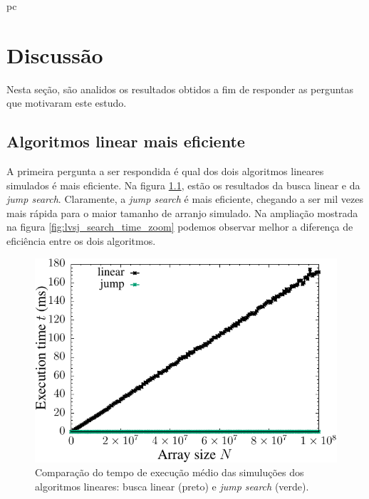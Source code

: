 pc\chapter{Discussão}

Nesta seção, são analidos os resultados obtidos a fim de responder as perguntas que motivaram este estudo.

\section{Algoritmos linear mais eficiente}

A primeira pergunta a ser respondida é qual dos dois algoritmos lineares simulados é mais eficiente. Na figura \ref{fig:lvsj_search_time}, estão os resultados da busca linear e da {\it jump search}. Claramente, a {\it jump search} é mais eficiente, chegando a ser mil vezes mais rápida para o maior tamanho de arranjo simulado. Na ampliação mostrada na figura \ref{fig:lvsj_search_time_zoom} podemos observar melhor a diferença de eficiência entre os dois algoritmos. 

\begin{figure}[H]
  \centering
  \includegraphics[scale=1.2]{../plots/lvsj_search_time.pdf}
  \caption{Comparação do tempo de execução médio das simuluções dos algoritmos lineares: busca linear (preto) e {\it jump search} (verde).}
  \label{fig:lvsj_search_time}
\end{figure} 

